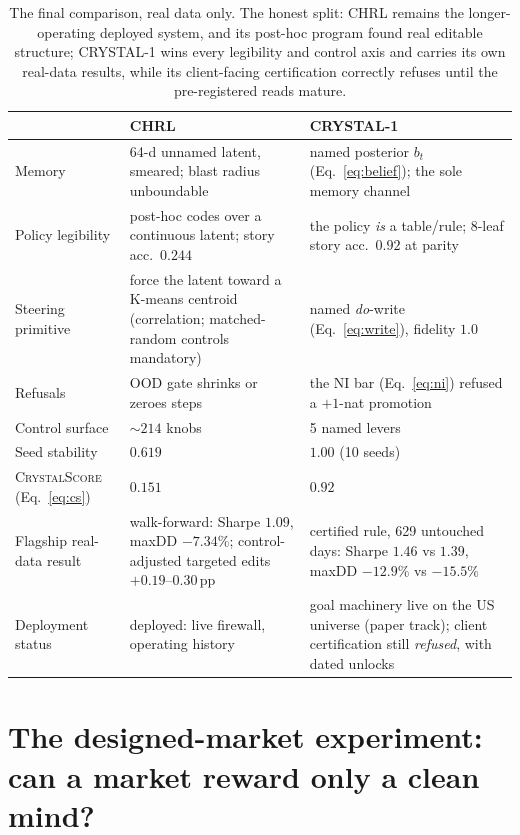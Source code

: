 \documentclass[11pt]{article}
\begin{document}
\begin{table}[h]
\centering\small
\begin{tabular}{p{3.4cm}p{5.2cm}p{5.2cm}}
\toprule
 & \textbf{CHRL} & \textbf{CRYSTAL-1} \\
\midrule
Memory & 64-d unnamed latent, smeared; blast radius unboundable & named posterior $b_t$
(Eq.~\ref{eq:belief}); the sole memory channel \\
Policy legibility & post-hoc codes over a continuous latent; story acc.\ $0.244$ & the policy
\emph{is} a table/rule; 8-leaf story acc.\ $0.92$ at parity \\
Steering primitive & force the latent toward a K-means centroid (correlation; matched-random
controls mandatory) & named \emph{do}-write (Eq.~\ref{eq:write}), fidelity $1.0$ \\
Refusals & OOD gate shrinks or zeroes steps & the NI bar (Eq.~\ref{eq:ni}) refused a $+1$-nat
promotion \\
Control surface & ${\sim}214$ knobs & 5 named levers \\
Seed stability & $0.619$ & $1.00$ (10 seeds) \\
\textsc{CrystalScore} (Eq.~\ref{eq:cs}) & $\mathbf{0.151}$ & $\mathbf{0.92}$ \\
Flagship real-data result & walk-forward: Sharpe $1.09$, maxDD $-7.34\%$; control-adjusted
targeted edits $+0.19$--$0.30$\,pp & certified rule, 629 untouched days: Sharpe $1.46$ vs
$1.39$, maxDD $-12.9\%$ vs $-15.5\%$ \\
Deployment status & deployed: live firewall, operating history & goal machinery live on the US
universe (paper track); client certification still \emph{refused}, with dated unlocks \\
\bottomrule
\end{tabular}
\caption{The final comparison, real data only. The honest split: CHRL remains the
longer-operating deployed system, and its post-hoc program found real editable structure;
CRYSTAL-1 wins every legibility and control axis and carries its own real-data results, while
its client-facing certification correctly refuses until the pre-registered reads mature.}
\label{tab:final}
\end{table}

\section{The designed-market experiment: can a market reward only a clean mind?}
\label{sec:polygon}
\end{document}
